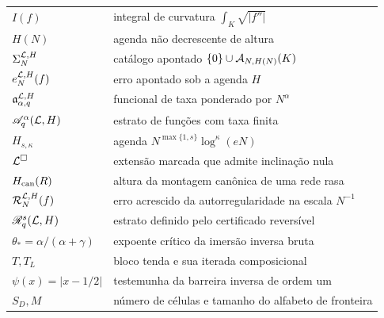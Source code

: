 \begin{longtable}{@{}>{\raggedright\arraybackslash}p{.27\linewidth}>{\raggedright\arraybackslash}p{.68\linewidth}@{}}
$I(f)$ & integral de curvatura $\int_K\sqrt{|f''|}$\\
$H(N)$ & agenda não decrescente de altura\\
$\Sigma_N^{\mathcal{L},H}$ & catálogo apontado $\{0\}\cup\mathcal{A}_{N,H(N)}(K)$\\
$e_N^{\mathcal{L},H}(f)$ & erro apontado sob a agenda $H$\\
$\mathfrak a_{\alpha,q}^{\mathcal{L},H}$ & funcional de taxa ponderado por $N^\alpha$\\
$\mathscr A_q^\alpha(\mathcal{L},H)$ & estrato de funções com taxa finita\\
$H_{s,\kappa}$ & agenda $N^{\max\{1,s\}}\log^\kappa(eN)$\\
$\mathcal{L}^\square$ & extensão marcada que admite inclinação nula\\
$H_{\rm can}(R)$ & altura da montagem canônica de uma rede rasa\\
$\mathcal R_N^{\mathcal{L},H}(f)$ & erro acrescido da autorregularidade na escala $N^{-1}$\\
$\mathscr R_q^s(\mathcal{L},H)$ & estrato definido pelo certificado reversível\\
$\theta_*=\alpha/(\alpha+\gamma)$ & expoente crítico da imersão inversa bruta\\
$T,T_L$ & bloco tenda e sua iterada composicional\\
$\psi(x)=|x-1/2|$ & testemunha da barreira inversa de ordem um\\
$S_D,M$ & número de células e tamanho do alfabeto de fronteira\\
\bottomrule
\end{longtable}

